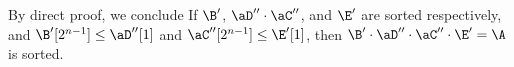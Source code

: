 \documentclass[11pt, sakura, night, 1in]{hw}
\begin{document}
By direct proof, we conclude If $\B'$, $\aD''\cd\aC''$, and $\E'$ are sorted respectively, and $\B'[2^{n-1}]\le\aD''[1]$ and $\aC''[2^{n-1}]\le\E'[1]$, then $\B'\cd\aD''\cd\aC''\cd\E'=\A$ is sorted.


\begin{comment}
    To this end, since $\A[1..2^{n-1}]$ is sorted in non-decreasing order on L4 and remains unchanged after that, $\A[\bra{2^{n-1}+1}..\bra{2^{n}+2^{n-1}}]$ is sorted in non-decreasing order on L6 and remains unchanged after that, and $\A[\bra{2^{n}+2^{n-1}+1}..2^{n+1}]$ is sorted in non-decreasing order on L5 and remains unchanged after that, it suffices to show that $\A[2^{n-1}]\le\A[2^{n-1}+1]$ and $\A[2^{n}+2^{n-1}]\le\A[2^{n}+2^{n-1}+1]$, then it follows that $\A$ immediately before halts is in non-decreasing order. \\

    First, since at this moment we have $\A=\B'\cd\aD''\cd\aC''\cd\E'$, so $\A[2^{n-1}]= \B'[2^{n-1}]$ and $\A[2^{n-1}+1]= \aD''[1]$. Because $\aD''\cd\aC''$ has the same multiset as $\aD'\cd\aC'$ from L6, and $\aD''\cd\aC'', \aD', \aC'$ are in non-decreasing orders, so $\A[2^{n-1}+1]= \aD''[1]$ implies ($\A[2^{n-1}+1]=\aD'[1]$ or $\A[2^{n-1}+1]=\aC'[1]$).

    Since we assumed $\A[2^{n-1}+1]= \aD''[1]$, by modus ponens we have $\A[2^{n-1}+1]=\aD'[1]$ or $\A[2^{n-1}+1]=\aC'[1]$.
    \begin{proofcases}
        \case $\A[2^{n-1}+1]=\aD'[1]$.
        \indenv{
            Since $\B'$ and $\aD'$ are in non-decreasing orders, and $A[2^{n-1}]=\B[2^{n-1}]$, thus combining with $\B'[2^{n-1}]\le \aD'[1]$ we get $\A[2^{n-1}]= \B'[2^{n-1}]\le \aD'[1]= \A[2^{n-1}+1]$.
        }
        For Case 1 we have shown that $\A[2^{n-1}]\le \A[2^{n-1}+1]$.
        \case $\A[2^{n-1}+1]=\aC'[1]$.
        \indenv{
            
        }
        For Case 2 we have shown that $\A[2^{n-1}]\le \A[2^{n-1}+1]$.
    \end{proofcases}

    For all cases we have shown that $\A[2^{n-1}]\le \A[2^{n-1}+1]$. Hence we conclude $\A[2^{n-1}]\le \A[2^{n-1}+1]$.\\
    
    Second, since at this moment we have $\A=\B'\cd\aD''\cd\aC''\cd\E'$, so $\A[2^{n}+2^{n-1}]\in \aC''$ and $\A[2^{n}+2^{n-1}+1]\in \E'$. Because $\aD''\cd\aC''$ has the same multiset as $\aD'\cd\aC'$ from L6, $\A[2^{n}+2^{n-1}]\in \aC''$ implies ($\A[2^{n}+2^{n-1}]\in\aD'$ or $\A[2^{n}+2^{n-1}]\in\aC'$).


\end{comment}
\end{document}
